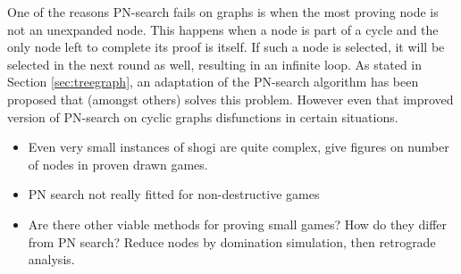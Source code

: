 \documentclass{article}
\begin{document}
One of the reasons PN-search fails on graphs is when the most proving node is not an unexpanded node. This happens when a node is part of a cycle
and the only node left to complete its proof is itself. If such a node is selected, it will be selected in the next round as well, resulting
in an infinite loop. As stated in Section \ref{sec:treegraph}, an adaptation of the PN-search algorithm has been proposed that (amongst others)
solves this problem. However even that improved version of PN-search on cyclic graphs disfunctions in certain situations.


\begin{itemize}
	\item Even very small instances of shogi are quite complex, give figures on number of nodes in proven drawn games.
	\item PN search not really fitted for non-destructive games
	\item Are there other viable methods for proving small games? How do they differ from PN search? Reduce nodes by domination simulation, then retrograde analysis.
\end{itemize}
\end{document}
